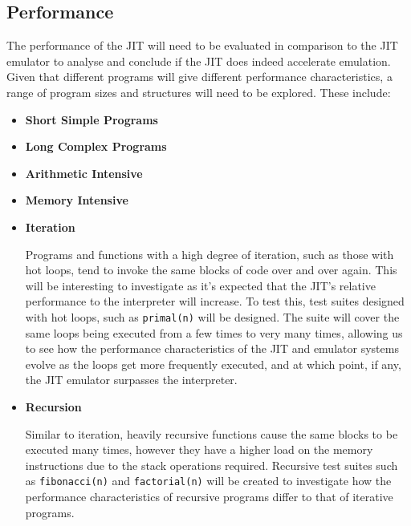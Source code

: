 \subsection{Performance}

The performance of the JIT will need to be evaluated in comparison to the JIT emulator to analyse and conclude if the JIT does indeed accelerate emulation. Given that different programs will give different performance characteristics, a range of program sizes and structures will need to be explored. These include:

\begin{itemize}
    \item \textbf{Short Simple Programs}
    \item \textbf{Long Complex Programs}
    \item \textbf{Arithmetic Intensive}
    \item \textbf{Memory Intensive}
    \item \textbf{Iteration}
    
    Programs and functions with a high degree of iteration, such as those with hot loops, tend to invoke the same blocks of code over and over again. This will be interesting to investigate as it's expected that the JIT's relative performance to the interpreter will increase. To test this, test suites designed with hot loops, such as \texttt{primal(n)} will be designed. The suite will cover the same loops being executed from a few times to very many times, allowing us to see how the performance characteristics of the JIT and emulator systems evolve as the loops get more frequently executed, and at which point, if any, the JIT emulator surpasses the interpreter.

    \item \textbf{Recursion}
    
    Similar to iteration, heavily recursive functions cause the same blocks to be executed many times, however they have a higher load on the memory instructions due to the stack operations required. Recursive test suites such as \texttt{fibonacci(n)} and \texttt{factorial(n)} will be created to investigate how the performance characteristics of recursive programs differ to that of iterative programs.
\end{itemize}
